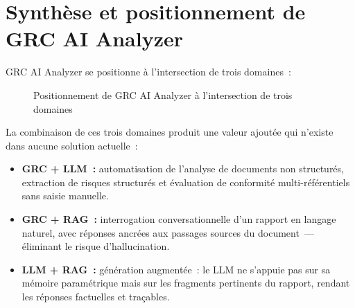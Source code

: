 \documentclass[a4paper,12pt,oneside]{report}
\begin{document}
	\section{Synth\`ese et positionnement de GRC AI Analyzer}
	
	GRC AI Analyzer se positionne \`a l'intersection de trois domaines~:
	
	\begin{figure}[H]
		\centering
		\caption{Positionnement de GRC AI Analyzer \`a l'intersection de trois domaines}
		\label{fig:positionnement}
	\end{figure}
	
	La combinaison de ces trois domaines produit une valeur ajout\'ee
	qui n'existe dans aucune solution actuelle~:
	
	\begin{itemize}[leftmargin=1.5em,itemsep=6pt]
		\item \textbf{GRC + LLM~:} automatisation de l'analyse de documents non
		structur\'es, extraction de risques structur\'es et \'evaluation de
		conformit\'e multi-r\'ef\'erentiels sans saisie manuelle.
		\item \textbf{GRC + RAG~:} interrogation conversationnelle d'un rapport en
		langage naturel, avec r\'eponses ancr\'ees aux passages sources du
		document~--- \'eliminant le risque d'hallucination.
		\item \textbf{LLM + RAG~:} g\'en\'eration augment\'ee~: le LLM ne s'appuie
		pas sur sa m\'emoire param\'etrique mais sur les fragments pertinents
		du rapport, rendant les r\'eponses factuelles et tra\c{c}ables.
	\end{itemize}
	
\end{document}
